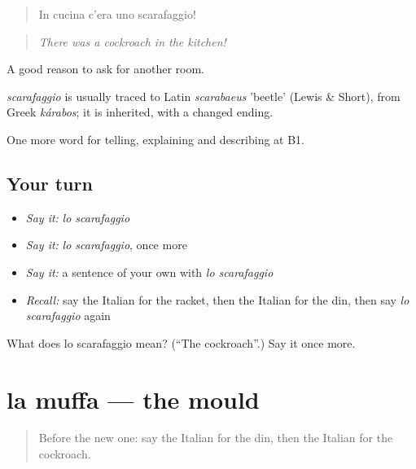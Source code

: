 \begin{quote}
In cucina c'era uno scarafaggio!
\end{quote}

\begin{quote}
\emph{There was a cockroach in the kitchen!}
\end{quote}

A good reason to ask for another room.

\begin{cousinweb}
\emph{scarafaggio} is usually traced to Latin \emph{scarabaeus} 'beetle' (Lewis \& Short), from Greek \emph{kárabos}; it is inherited, with a changed ending.
\end{cousinweb}

\begin{grammarlens}[title={What you've built}]
One more word for telling, explaining and describing at B1.
\end{grammarlens}

\subsection*{Your turn}
\begin{itemize}
\raggedright
  \item \emph{Say it:} \emph{lo scarafaggio}
  \item \emph{Say it:} \emph{lo scarafaggio}, once more
  \item \emph{Say it:} a sentence of your own with \emph{lo scarafaggio}
  \item \emph{Recall:} say the Italian for the racket, then the Italian for the din, then say \emph{lo scarafaggio} again
\end{itemize}

\begin{tcolorbox}[breakable,colback=teal!4,colframe=teal!35!black,title={Before you move on}]
What does lo scarafaggio mean? (\textquotedblleft{}The cockroach\textquotedblright{}.) Say it once more.
\end{tcolorbox}
\section[la muffa]{la muffa — the mould}

\label{lesson:IT-C437-muffa}



\begin{quote}
Before the new one: say the Italian for the din, then the Italian for the cockroach.
\end{quote}

